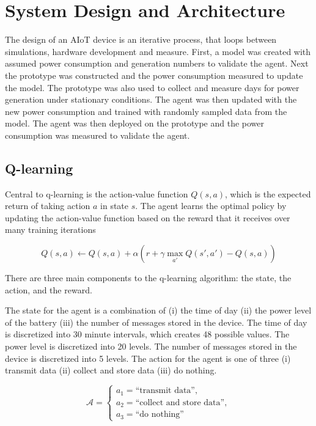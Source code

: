 \documentclass[10pt]{cai}
\begin{document}
\section{System Design and Architecture}

The design of an AIoT device is an iterative process, that loops between simulations, hardware development and measure.
First, a model was created with assumed power consumption and generation numbers to validate the agent.
Next the prototype was constructed and the power consumption measured to update the model.
The prototype was also used to collect and measure days for power generation under stationary conditions.
The agent was then updated with the new power consumption and trained with randomly sampled data from the model.
The agent was then deployed on the prototype and the power consumption was measured to validate the agent.

\subsection{Q-learning}

Central to q-learning is the action-value function $Q(s,a)$, which is the expected return of taking action $a$ in state $s$.
The agent learns the optimal policy by updating the action-value function based on the reward that it receives over many training iterations

\begin{equation}
  Q(s,a) \leftarrow Q(s,a) + \alpha \left( r + \gamma \max_{a'} Q(s',a') - Q(s,a) \right)
\end{equation}

There are three main components to the q-learning algorithm: the state, the action, and the reward.

The state for the agent is a combination of (i) the time of day (ii) the power level of the battery (iii) the number of messages stored in the device.
The time of day is discretized into 30 minute intervals, which creates 48 possible values. 
The power level is discretized into 20 levels. 
The number of messages stored in the device is discretized into 5 levels.
The action for the agent is one of three (i) transmit data (ii) collect and store data (iii) do nothing.


\begin{equation}
  \mathcal{A} = \left\{
  \begin{array}{l}
  a_1 = \text{``transmit data''}, \\
  a_2 = \text{``collect and store data''}, \\
  a_3 = \text{``do nothing''}
  \end{array}
  \right.
  \end{equation}
  
\end{document}
